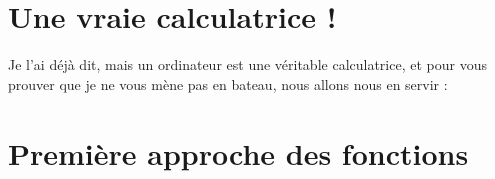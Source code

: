 \section{Une vraie calculatrice !}
Je l'ai déjà dit, mais un ordinateur est une véritable calculatrice, et pour vous prouver que
je ne vous mène pas en bateau, nous allons nous en servir :
\section{Première approche des fonctions}